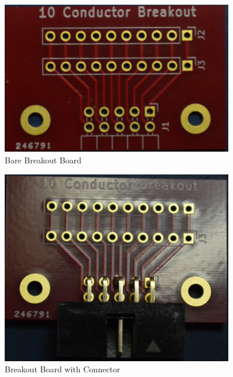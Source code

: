 \documentclass[10pt, openany]{book}
\begin{document}
\begin{figure}[ht!]
  \centering
  \includegraphics[width=0.9\textwidth]{../Pict/Breakout-Bare.jpg}
  \caption{Bare Breakout Board}
  \label{fig:BreakoutBare}
\end{figure}

\begin{figure}[ht!]
  \centering
  \includegraphics[width=0.9\textwidth]{../Pict/Breakout-Connector.jpg}
  \caption{Breakout Board with Connector}
  \label{fig:BreakoutConnector}
\end{figure}
\end{document}
